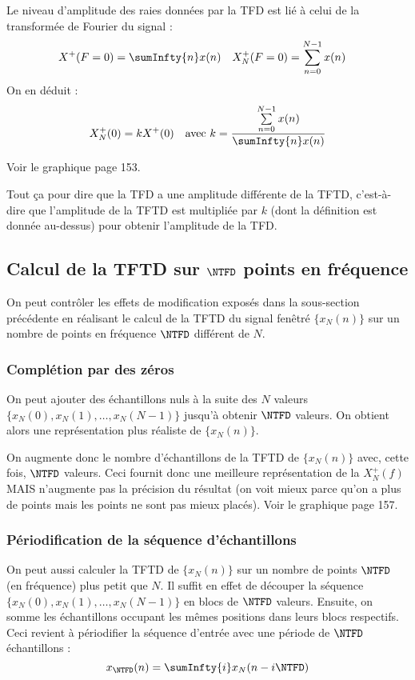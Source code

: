                 Le niveau d'amplitude des raies données par la TFD est lié à celui de la transformée de Fourier du signal :
                \begin{align*}
                    X^+(F = 0) &= \sumInfty{n} x(n) & X_N^+(F = 0) &= \sum_{n=0}^{N-1} x(n)
                \end{align*}
                On en déduit :
                \begin{align*}
                    X_N^+(0) &= kX^+(0) &\text{avec } k = \frac{\sum\limits_{n=0}^{N-1} x(n)}{\sumInfty{n} x(n)}
                \end{align*}

                Voir le graphique page 153.

                Tout ça pour dire que la TFD a une amplitude différente de la TFTD, c'est-à-dire que l'amplitude de la TFTD est multipliée par $k$ (dont la définition est donnée au-dessus) pour obtenir l'amplitude de la TFD.

        \subsection{Calcul de la TFTD sur $\NTFD$ points en fréquence}
            On peut contrôler les effets de modification exposés dans la sous-section précédente en réalisant le calcul de la TFTD du signal fenêtré $\{x_N(n)\}$ sur un nombre de points en fréquence $\NTFD$\index{$\NTFD$} différent de $N$.

            \subsubsection{Complétion par des zéros}
                On peut ajouter des échantillons nuls à la suite des $N$ valeurs $\{x_N(0), x_N(1), \dots, x_N(N-1)\}$ jusqu'à obtenir $\NTFD$ valeurs. On obtient alors une représentation plus réaliste de $\{x_N(n)\}$.

                On augmente donc le nombre d'échantillons de la TFTD de $\{x_N(n)\}$ avec, cette fois, $\NTFD$ valeurs. Ceci fournit donc une meilleure représentation de la $X_N^+(f)$ MAIS n'augmente pas la précision du résultat (on voit mieux parce qu'on a plus de points mais les points ne sont pas mieux placés). Voir le graphique page 157.

            \subsubsection{Périodification de la séquence d'échantillons}
                On peut aussi calculer la TFTD de $\{x_N(n)\}$ sur un nombre de points $\NTFD$ (en fréquence) plus petit que $N$. Il suffit en effet de découper la séquence $\{x_N(0), x_N(1), \dots, x_N(N-1)\}$ en blocs de $\NTFD$ valeurs. Ensuite, on somme les échantillons occupant les mêmes positions dans leurs blocs respectifs. Ceci revient à périodifier la séquence d'entrée avec une période de $\NTFD$ échantillons :
                $$
                    x_{\NTFD}(n) = \sumInfty{i} x_N(n-i \NTFD)
                $$
                
